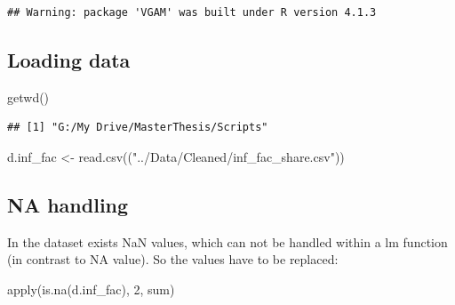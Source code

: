 \documentclass[
]{article}
\newenvironment{Shaded}{\begin{snugshade}}{\end{snugshade}}
\newcommand{\DecValTok}[1]{\textcolor[rgb]{0.00,0.00,0.81}{#1}}
\newcommand{\FunctionTok}[1]{\textcolor[rgb]{0.00,0.00,0.00}{#1}}
\newcommand{\NormalTok}[1]{#1}
\newcommand{\OtherTok}[1]{\textcolor[rgb]{0.56,0.35,0.01}{#1}}
\newcommand{\StringTok}[1]{\textcolor[rgb]{0.31,0.60,0.02}{#1}}
\begin{document}
\begin{verbatim}
## Warning: package 'VGAM' was built under R version 4.1.3
\end{verbatim}

\hypertarget{loading-data}{%
\subsection{Loading data}\label{loading-data}}

\begin{Shaded}
\begin{Highlighting}[]
\FunctionTok{getwd}\NormalTok{()}
\end{Highlighting}
\end{Shaded}

\begin{verbatim}
## [1] "G:/My Drive/MasterThesis/Scripts"
\end{verbatim}

\begin{Shaded}
\begin{Highlighting}[]
\NormalTok{d.inf\_fac }\OtherTok{\textless{}{-}} \FunctionTok{read.csv}\NormalTok{((}\StringTok{"../Data/Cleaned/inf\_fac\_share.csv"}\NormalTok{))}
\end{Highlighting}
\end{Shaded}

\hypertarget{na-handling}{%
\subsection{NA handling}\label{na-handling}}

In the dataset exists NaN values, which can not be handled within a lm
function (in contrast to NA value). So the values have to be replaced:

\begin{Shaded}
\begin{Highlighting}[]
\FunctionTok{apply}\NormalTok{(}\FunctionTok{is.na}\NormalTok{(d.inf\_fac), }\DecValTok{2}\NormalTok{, sum)}
\end{Highlighting}
\end{Shaded}
\end{document}

